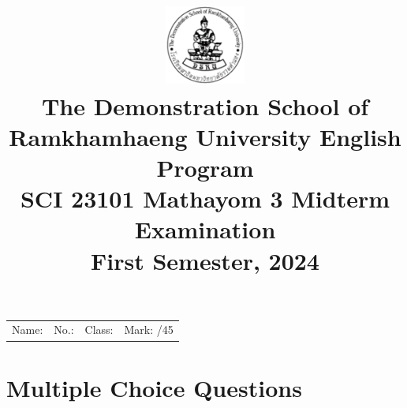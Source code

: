 \documentclass{article}
\title{
    \includegraphics[width=0.2\textwidth]{satit ram logo.png}\\
    \fontsize{18pt}{18pt}\selectfont
    The Demonstration School of Ramkhamhaeng University English Program\\
    SCI 23101 Mathayom 3 Midterm Examination\\
    First Semester, 2024
}
\author{}
\date{}
\begin{document}
\maketitle

\begin{flushleft}
\begin{tabular}{l l l l}
Name: \underline{\hspace{5cm}} & No.: \underline{\hspace{2cm}} & Class: \underline{\hspace{2cm}} & Mark: \underline{\hspace{2cm}} /45 \\
\end{tabular}
\end{flushleft}

\section*{Multiple Choice Questions}
\end{document}
